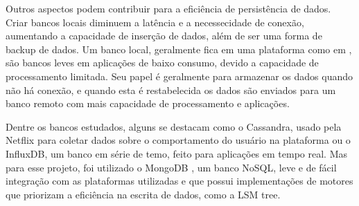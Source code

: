 Outros aspectos podem contribuir para a eficiência de persistência de dados. Criar bancos locais diminuem a latência e a necessecidade de conexão, aumentando a capacidade de inserção de dados, além de ser uma forma de backup de dados. Um banco local, geralmente fica em uma plataforma como em \cite{Paethong-Sato-Namiki}, são bancos leves em aplicações de baixo consumo, devido a capacidade de processamento limitada. Seu papel é geralmente para armazenar os dados quando não há conexão, e quando esta é restabelecida os dados são enviados para um banco remoto com mais capacidade de processamento e aplicações. %

Dentre os bancos estudados, alguns se destacam como o Cassandra, usado pela Netflix para coletar dados sobre o comportamento do usuário na plataforma ou o InfluxDB, um banco em série de temo, feito para aplicações em tempo real. Mas para esse projeto, foi utilizado o MongoDB \cite{mongodb}, um banco NoSQL, leve e de fácil integração com as plataformas utilizadas e que possui implementações de motores que priorizam a eficiência na escrita de dados, como a LSM tree.





